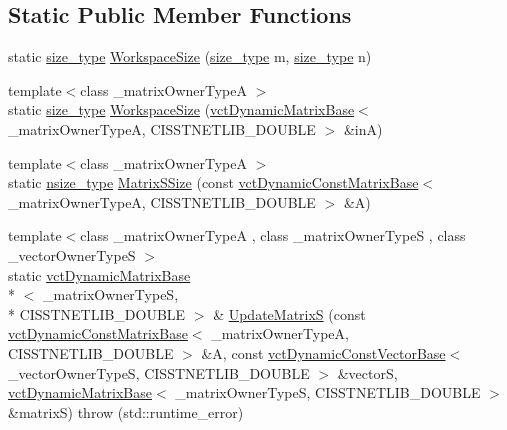 \subsection*{Static Public Member Functions}
\begin{DoxyCompactItemize}
\item 
static \hyperlink{classnmr_s_v_d_economy_dynamic_data_aee8ff15f2e92af24fdc3c7f5908770f3}{size\-\_\-type} \hyperlink{classnmr_s_v_d_economy_dynamic_data_a32eab3e8694ef5e6db13ea76f7ba1460}{Workspace\-Size} (\hyperlink{classnmr_s_v_d_economy_dynamic_data_aee8ff15f2e92af24fdc3c7f5908770f3}{size\-\_\-type} m, \hyperlink{classnmr_s_v_d_economy_dynamic_data_aee8ff15f2e92af24fdc3c7f5908770f3}{size\-\_\-type} n)
\item 
{\footnotesize template$<$class \-\_\-matrix\-Owner\-Type\-A $>$ }\\static \hyperlink{classnmr_s_v_d_economy_dynamic_data_aee8ff15f2e92af24fdc3c7f5908770f3}{size\-\_\-type} \hyperlink{classnmr_s_v_d_economy_dynamic_data_a459cde58b321abda29a67c452e9024f5}{Workspace\-Size} (\hyperlink{classvct_dynamic_matrix_base}{vct\-Dynamic\-Matrix\-Base}$<$ \-\_\-matrix\-Owner\-Type\-A, C\-I\-S\-S\-T\-N\-E\-T\-L\-I\-B\-\_\-\-D\-O\-U\-B\-L\-E $>$ \&in\-A)
\item 
{\footnotesize template$<$class \-\_\-matrix\-Owner\-Type\-A $>$ }\\static \hyperlink{classnmr_s_v_d_economy_dynamic_data_a237cfc6761af61ac2016b2b1e71284f1}{nsize\-\_\-type} \hyperlink{classnmr_s_v_d_economy_dynamic_data_a5cd19015abc8a58fc254c1b4763b9d48}{Matrix\-S\-Size} (const \hyperlink{classvct_dynamic_const_matrix_base}{vct\-Dynamic\-Const\-Matrix\-Base}$<$ \-\_\-matrix\-Owner\-Type\-A, C\-I\-S\-S\-T\-N\-E\-T\-L\-I\-B\-\_\-\-D\-O\-U\-B\-L\-E $>$ \&A)
\item 
{\footnotesize template$<$class \-\_\-matrix\-Owner\-Type\-A , class \-\_\-matrix\-Owner\-Type\-S , class \-\_\-vector\-Owner\-Type\-S $>$ }\\static \hyperlink{classvct_dynamic_matrix_base}{vct\-Dynamic\-Matrix\-Base}\\*
$<$ \-\_\-matrix\-Owner\-Type\-S, \\*
C\-I\-S\-S\-T\-N\-E\-T\-L\-I\-B\-\_\-\-D\-O\-U\-B\-L\-E $>$ \& \hyperlink{classnmr_s_v_d_economy_dynamic_data_ac7889a8e3afcfa09a985385ca9a87c9d}{Update\-Matrix\-S} (const \hyperlink{classvct_dynamic_const_matrix_base}{vct\-Dynamic\-Const\-Matrix\-Base}$<$ \-\_\-matrix\-Owner\-Type\-A, C\-I\-S\-S\-T\-N\-E\-T\-L\-I\-B\-\_\-\-D\-O\-U\-B\-L\-E $>$ \&A, const \hyperlink{classvct_dynamic_const_vector_base}{vct\-Dynamic\-Const\-Vector\-Base}$<$ \-\_\-vector\-Owner\-Type\-S, C\-I\-S\-S\-T\-N\-E\-T\-L\-I\-B\-\_\-\-D\-O\-U\-B\-L\-E $>$ \&vector\-S, \hyperlink{classvct_dynamic_matrix_base}{vct\-Dynamic\-Matrix\-Base}$<$ \-\_\-matrix\-Owner\-Type\-S, C\-I\-S\-S\-T\-N\-E\-T\-L\-I\-B\-\_\-\-D\-O\-U\-B\-L\-E $>$ \&matrix\-S)  throw (std\-::runtime\-\_\-error)
\end{DoxyCompactItemize}

